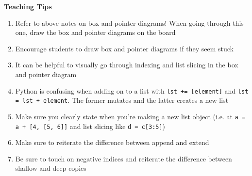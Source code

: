 \begin{questionmeta}
    \textbf{Teaching Tips}
    \begin{enumerate}
            \item Refer to above notes on box and pointer diagrams! When going through this one, draw the box and pointer diagrams on the board
            \item Encourage students to draw box and pointer diagrams if they seem stuck
            \item It can be helpful to visually go through indexing and list slicing in the box and pointer diagram
            \item Python is confusing when adding on to a list with \lstinline{lst += [element]} and \lstinline{lst = lst + element}. The former mutates and the latter creates a new list
            \item Make sure you clearly state when you’re making a new list object (i.e. at \lstinline{a = a + [4, [5, 6]]} and list slicing like \lstinline{d = c[3:5]})
            \item Make sure to reiterate the difference between append and extend
            \item Be sure to touch on negative indices and reiterate the difference between shallow and deep copies
    \end{enumerate}
\end{questionmeta}
